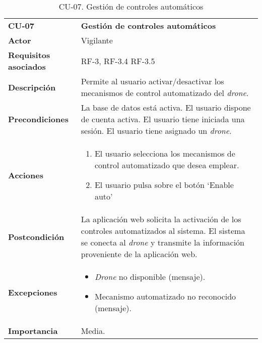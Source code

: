 \begin{table}
	\begin{center}
		\begin{tabular}{m{3cm}  m{10cm}}\hline
			\toprule
			\textbf{CU-07} & \textbf{Gestión de controles automáticos}\\
			\otoprule
			\textbf{Actor} & Vigilante\\
			\textbf{Requisitos asociados} & RF-3, RF-3.4 RF-3.5\\
			\textbf{Descripción} & Permite al usuario activar/desactivar los mecanismos de control automatizado del \emph{drone}.\\
			\textbf{Precondiciones} & La base de datos está activa. El usuario dispone de cuenta activa. El usuario tiene iniciada una sesión. El usuario tiene asignado un \emph{drone}.\\
			\textbf{Acciones} & \begin{enumerate}
											\item El usuario selecciona los mecanismos de control automatizado que desea emplear.
											\item El usuario pulsa sobre el botón `Enable auto'
											\end{enumerate}\\
											
			\textbf{Postcondición} & La aplicación web solicita la activación de los controles automatizados al sistema. El sistema se conecta al \emph{drone} y transmite la información proveniente de la aplicación web.\\
			\textbf{Excepciones} & \begin{itemize}
												\item \emph{Drone} no disponible (mensaje).
												\item Mecanismo automatizado no reconocido (mensaje).
												\end{itemize}\\
			\textbf{Importancia} & Media.\\
			\hline
			\bottomrule
		\end{tabular}
		\caption{CU-07. Gestión de controles automáticos}
		\label{tb:CU07}
	\end{center}
\end{table}


